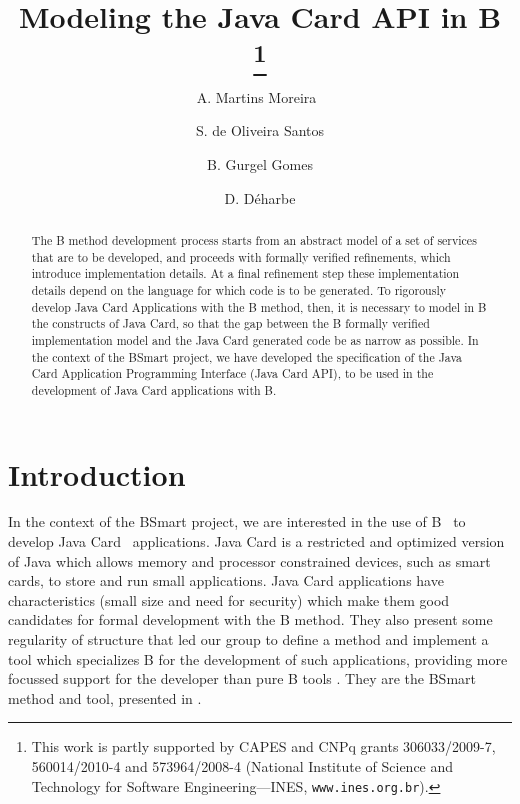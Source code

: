 \documentclass{llncs}
\begin{document}
\mainmatter

\title{Modeling the Java Card API in B \thanks{This work is partly supported by CAPES
 and CNPq grants 306033/2009-7, 560014/2010-4 and 573964/2008-4
 (National Institute of Science and Technology for Software Engineering---INES, \texttt{www.ines.org.br}).}}

\author{A. Martins Moreira\ \and S. de Oliveira Santos \and B. Gurgel Gomes \and D. D\'{e}harbe}


\maketitle

\begin{abstract} 
  The B method development process starts from an abstract model of a
  set of services that are to be developed, and proceeds with formally
  verified refinements, which introduce implementation details. At a
  final refinement step these implementation details depend on the
  language for which code is to be generated. To rigorously develop
  Java Card Applications with the B method, then, it is necessary to
  model in B the constructs of Java Card, so that the gap between the
  B formally verified implementation model and the Java Card generated
  code be as narrow as possible. In the context of the BSmart project,
  we have developed the specification of the Java Card Application
  Programming Interface (Java Card API), to be used in the development
  of Java Card applications with B.
\end{abstract}

\section{Introduction}\label{intro}

In the context of the BSmart project, we are interested in the use of
B~\cite{BBook} to develop Java Card~\cite{chen:2000} applications.  Java Card is a
restricted and optimized version of Java which allows memory and
processor constrained devices, such as smart cards, to store and run
small applications.  Java Card applications have characteristics
(small size and need for security) which make them good candidates for
formal development with the B method. They also present some
regularity of structure that led our group to define a method and
implement a tool which specializes B for the development of such
applications, providing more focussed support for the developer than pure B
tools \cite{atelierB,proB}. They are the BSmart method and tool,
presented in \cite{BSmart08,Gomes10}.
\end{document}
